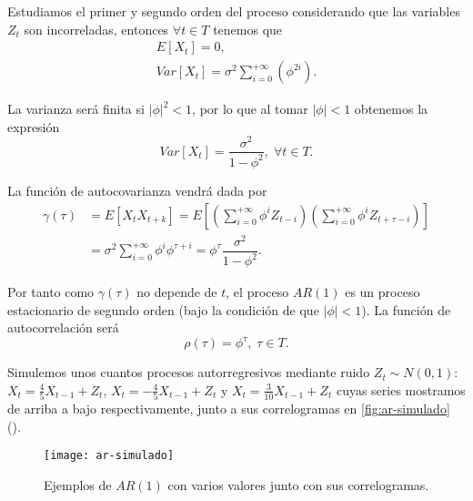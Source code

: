 Estudiamos el primer y segundo orden del proceso considerando que las variables $Z_t$ son incorreladas, entonces $\forall t \in T$ tenemos que
\begin{gather*}
  E[X_t] = 0, \\
  Var[X_t] = \sigma^2 \sum \limits^{+\infty}_{i = 0} \left(\phi^{2i}\right).
  \label{eq:ar-momentos}
\end{gather*}

La varianza será finita si $|\phi|^2 < 1$, por lo que al tomar $|\phi| < 1$ obtenemos la expresión
\begin{equation*}
  Var[X_t] = \dfrac{\sigma^2}{1 - \phi^2}, \; \forall t \in T.
  \label{eq:ar-var}
\end{equation*}

La función de autocovarianza vendrá dada por
\begin{equation}
  \begin{aligned}
    \gamma(\tau) & = E[X_t X_{t + k}] = E\left[\left(\sum \limits^{+\infty}_{i = 0} \phi^i Z_{t - i}\right)\left(\sum \limits^{+\infty}_{i = 0} \phi^i Z_{t + \tau - i}\right)\right] \\
    & = \sigma^2 \sum \limits^{+\infty}_{i = 0} \phi^i \phi^{\tau + i} = \phi^\tau \dfrac{\sigma^2}{1 - \phi^2}.
  \end{aligned}
  \label{eq:ar-autocovarianza}
\end{equation}

Por tanto como $\gamma(\tau)$ no depende de $t$, el proceso $AR(1)$ es un proceso estacionario de segundo orden (bajo la condición de que $|\phi| < 1$). La función de autocorrelación será
\begin{equation*}
  \rho(\tau) = \phi^\tau, \; \tau \in T.
  \label{eq:ar-autocorrelacion}
\end{equation*}

Simulemos unos cuantos procesos autorregresivos mediante ruido $Z_t \sim N(0, 1)$: $X_t = \frac{4}{5}X_{t-1} + Z_t$, $X_t = -\frac{4}{5}X_{t-1} + Z_t$ y $X_t = \frac{3}{10}X_{t-1} + Z_t$ cuyas series mostramos de arriba a bajo respectivamente, junto a sus correlogramas en \autoref{fig:ar-simulado} (\cite{chatfield2019analysis}).

\begin{figure}[htpb]
  \centering
  \texttt{[image: ar-simulado]}
  \caption{Ejemplos de $AR(1)$ con varios valores junto con sus correlogramas.}
  \label{fig:ar-simulado}
\end{figure}

